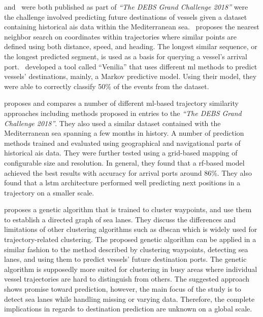 \cite{Rosca2018GrandRoutes} and~\cite{Bachar2018GrandDestination} were both published as part of \textit{``The DEBS Grand Challenge 2018''} were the challenge involved predicting future destinations of vessels given a dataset containing historical \acrshort{ais} data within the Mediterranean sea.~\cite{Rosca2018GrandRoutes} proposes the nearest neighbor search on coordinates within trajectories where similar points are defined using both distance, speed, and heading. The longest similar sequence, or the longest predicted segment, is used as a basis for querying a vessel's arrival port.~\cite{Bachar2018GrandDestination} developed a tool called ``Venilia'' that uses different \acrshort{ml} methods to predict vessels' destinations, mainly, a Markov predictive model. Using their model, they were able to correctly classify 50\% of the events from the dataset.

\cite{Karatas2020TrajectoryData} proposes and compares a number of different \acrshort{ml}-based trajectory similarity approaches including methods proposed in entries to the \textit{``The DEBS Grand Challenge 2018''}. They also used a similar dataset contained with the Mediterranean sea spanning a few months in history. A number of prediction methods trained and evaluated using geographical and navigational parts of historical \acrshort{ais} data. They were further tested using a grid-based mapping of configurable size and resolution. In general, they found that a \acrshort{rf}-based model achieved the best results with accuracy for arrival ports around 86\%. They also found that a \acrfull{lstm} architecture performed well predicting next positions in a trajectory on a smaller scale.

\cite{Dobrkovic2018MaritimeData} proposes a genetic algorithm that is trained to cluster waypoints, and use them to establish a directed graph of sea lanes. They discuss the differences and limitations of other clustering algorithms such as \acrshort{dbscan} which is widely used for trajectory-related clustering. The proposed genetic algorithm can be applied in a similar fashion to the method described \cite{pallotta} by clustering waypoints, detecting sea lanes, and using them to predict vessels' future destination ports. The genetic algorithm is supposedly more suited for clustering in busy areas where individual vessel trajectories are hard to distinguish from others. The suggested approach shows promise toward prediction, however, the main focus of the study is to detect sea lanes while handling missing or varying data. Therefore, the complete implications in regards to destination prediction are unknown on a global scale.

